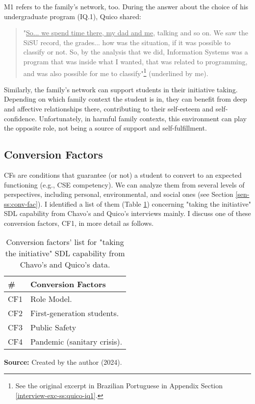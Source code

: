 \gls{M}1 refers to the family's network, too. During the answer about the choice of his undergraduate program (\gls{IQ}.1), Quico shared:
\begin{quote}
    "\underline{So... we spend time there, my dad and me}, talking and so on. We saw the \acrshort{SiSU} record, the grades... how was the situation, if it was possible to classify or not. So, by the analysis that we did, Information Systems was a program that was inside what I wanted, that was related to programming, and was also possible for me to classify"\footnote{See the original excerpt in Brazilian Portuguese in Appendix Section \ref{interview-exc-ss:quico-iq1}.} (underlined by me).
\end{quote}
Similarly, the family's network can support students in their initiative taking. Depending on which family context the student is in, they can benefit from deep and affective relationships there, contributing to their self-esteem and self-confidence. Unfortunately, in harmful family contexts, this environment can play the opposite role, not being a source of support and self-fulfillment.

\subsection{Conversion Factors}
\label{disc-ss:conversion-factors}

\glspl{CF} are conditions that guarantee (or not) a student to convert  to an expected functioning (e.g., \gls{CSE} competency). We can analyze them from several levels of perspectives, including personal, environmental, and social ones (see Section \ref{sen-ss:conv-fac}). I identified a list of them (Table \ref{tbl:conv-fac-list}) concerning "taking the initiative" \gls{SDL} capability from Chavo's and Quico's interviews mainly. I discuss one of these conversion factors, \gls{CF}1, in more detail as follows.

\begin{table}[ht]
\caption{Conversion factors' list for "taking the initiative" \acrshort{SDL} capability from Chavo's and Quico's data.}
\label{tbl:conv-fac-list}
\centering
{}
\begin{tabular}{p{0.8cm}p{5.5cm}}
\hline
\textbf{\#} &
\textbf{Conversion Factors}\\
\hline     
CF1 &
Role Model.\\
CF2 & 
First-generation students. \\
CF3 &
Public Safety \\
CF4 &
Pandemic (sanitary crisis).\\
\hline

\end{tabular}
\par\medskip\ABNTEXfontereduzida\selectfont\textbf{Source:} Created by the author (2024). \par\medskip
\end{table}

